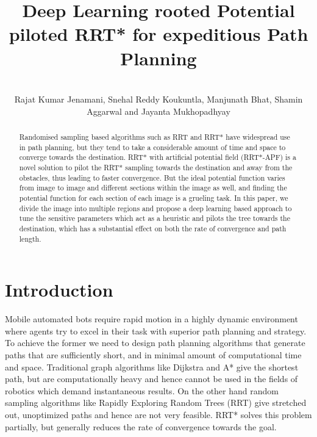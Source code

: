 \documentclass[runningheads]{llncs}
\begin{document}
%
\title{Deep Learning rooted Potential piloted RRT* for expeditious Path Planning}
%
%
\author{
 \\ Rajat Kumar Jenamani\inst{*}, Snehal Reddy Koukuntla\inst{*}, Manjunath Bhat\inst{*}, Shamin Aggarwal \inst{*} and Jayanta Mukhopadhyay }
%
%
%
\maketitle              %
%
\begin{abstract}
Randomised sampling based algorithms such as RRT and RRT* have widespread use in path planning, but they tend to take a considerable amount of time and space to converge towards the destination. RRT* with artificial potential field (RRT*-APF) is a novel solution to pilot the RRT* sampling towards the destination and away from the obstacles, thus leading to faster convergence. But the ideal potential function varies from image to image and different sections within the image as well, and finding the potential function for each section of each image is a grueling task. In this paper, we divide the image into multiple regions and propose a deep learning based approach to tune the sensitive parameters which act as a heuristic and pilots the tree towards the destination, which has a substantial effect on both the rate of convergence and path length.

\end{abstract}
%
%
%
\section{{Introduction}}
Mobile automated bots require rapid motion in a highly dynamic environment where agents try to excel in their task with superior path planning and strategy. To achieve the former we need to design path planning algorithms that generate paths that are sufficiently short, and in minimal amount of computational time and space. Traditional graph algorithms like Dijkstra and A* give the shortest path, but are computationally heavy and hence cannot be used in the fields of robotics which demand instantaneous results. On the other hand random sampling algorithms like Rapidly Exploring Random Trees (RRT) give stretched out, unoptimized paths and hence are not very feasible. RRT* solves this problem partially, but generally reduces the rate of convergence towards the goal. 
\end{document}
